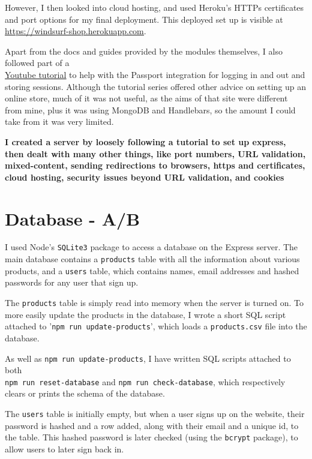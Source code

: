 \documentclass[12pt]{article}
\begin{document}
However, I then looked into cloud hosting, and used Heroku's HTTPs certificates and port options for my final deployment.
This deployed set up is visible at \underline{\url{https://windsurf-shop.herokuapp.com}}.

Apart from the docs and guides provided by the modules themselves, I also followed part of a \\
\underline{\href{https://www.youtube.com/watch?v=GHNLWHGCBEc}{Youtube tutorial}} to help with the Passport integration for logging in and out and storing sessions. Although the tutorial series offered other advice on setting up an online store, much of it was not useful, as the aims of that site were different from mine, plus it was using MongoDB and Handlebars, so the amount I could take from it was very limited.

\textbf{I created a server by loosely following a tutorial to set up express, then dealt with many other things, like port numbers, URL validation, mixed-content, sending redirections to browsers, https and certificates, cloud hosting, security issues beyond URL validation, and cookies}

\clearpage
\section*{Database \large\normalfont - A/B}
I used Node's \verb|SQLite3| package to access a database on the Express server.
The main database contains a \verb|products| table with all the information about various products, and a \verb|users| table, which contains names, email addresses and hashed passwords for any user that sign up. 

The \verb|products| table is simply read into memory when the server is turned on.
To more easily update the products in the database, I wrote a short SQL script attached to '\verb|npm run update-products|', which loads a \verb|products.csv| file into the database.

As well as \verb|npm run update-products|, I have written SQL scripts attached to both \\ \verb|npm run reset-database| and \verb|npm run check-database|, which respectively clears or prints the schema of the database.

The \verb|users| table is initially empty, but when a user signs up on the website, their password is hashed and a row added, along with their email and a unique id, to the table. This hashed password is later checked (using the \verb|bcrypt| package), to allow users to later sign back in.
\end{document}
